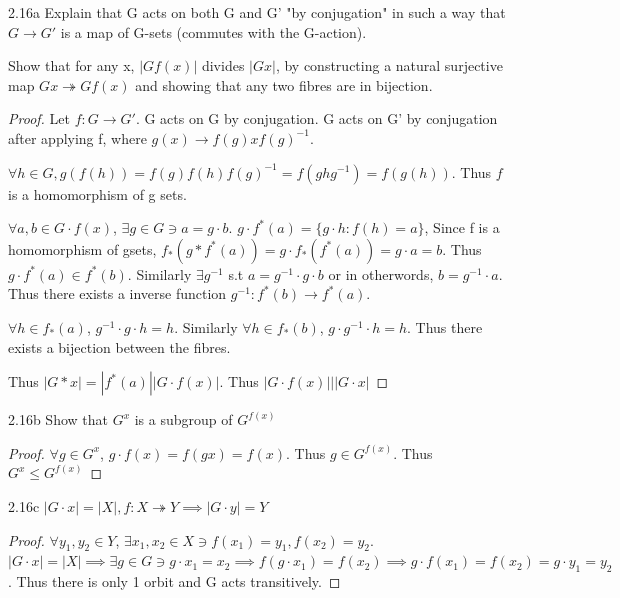 \documentclass{article}
\begin{document}
\begin{PROB}{2.16a}\label{Problem 2.16a.}
    Explain that G acts on both G and G' "by conjugation" in such a way that $G \to G'$ is a map of G-sets (commutes with the G-action). 

    Show that for any x, $|G f(x)|$ divides $|G x|$, by constructing a natural surjective map $G x \twoheadrightarrow G f(x)$ and showing that any two fibres are in bijection. 
\end{PROB}
\begin{proof}
    Let $f: G \to G'$. G acts on G by conjugation. G acts on G' by conjugation after applying f, where $g(x) \to f(g)xf(g)^{-1}$.

    $\forall h \in G, g(f(h)) = f(g) f(h) f(g)^{-1} = f(ghg^{-1}) = f(g(h))$. Thus $f$ is a homomorphism of g sets.

    $\forall a, b \in G \cdot {f(x)}$, $\exists g \in G \ni a = g \cdot b$. $g \cdot f^*(a) = \{g \cdot h : f(h) = a\}$, Since f is a homomorphism of gsets, $f_*(g * f^*(a)) = g \cdot f_*(f^*(a)) = g \cdot a = b$. Thus $g \cdot f^*(a) \in f^*(b)$. Similarly $\exists g^{-1}$ s.t $a = g^{-1} \cdot g \cdot b$ or in otherwords, $b = g^{-1} \cdot a$. Thus there exists a inverse function $g^{-1}: f^*(b) \to f^*(a)$. 

    $\forall h \in f_*(a)$, $g^{-1} \cdot g \cdot h = h$. Similarly $\forall h \in f_*(b)$, $g \cdot g^{-1} \cdot h = h$. 
    Thus there exists a bijection between the fibres. 
    
    Thus $|G * x| = |f^*(a)||G \cdot f(x)|$. Thus $|G \cdot f(x)| | |G \cdot x|$
\end{proof}

\begin{claim}{2.16b}
    Show that $G^x$ is a subgroup of $G^{f(x)}$
\end{claim}
\begin{proof}
    $\forall g \in G^x$, $g \cdot f(x) = f(gx) = f(x)$. Thus $g \in G^{f(x)}$. Thus $G^x \leq G^{f(x)}$
\end{proof}

\begin{claim}{2.16c}
    $|G \cdot x| = |X|, f: X \twoheadrightarrow Y \implies |G \cdot y| = Y$
\end{claim}
\begin{proof}
    $\forall y_1, y_2 \in Y$, $\exists x_1, x_2 \in X \ni f(x_1) = y_1, f(x_2) = y_2$. $|G \cdot x| = |X| \implies \exists g \in G \ni g \cdot x_1 = x_2 \implies f(g \cdot x_1) = f(x_2) \implies g \cdot f(x_1) = f(x_2) = g \cdot y_1 = y_2$. Thus there is only 1 orbit and G acts transitively. 
\end{proof}
\end{document}
